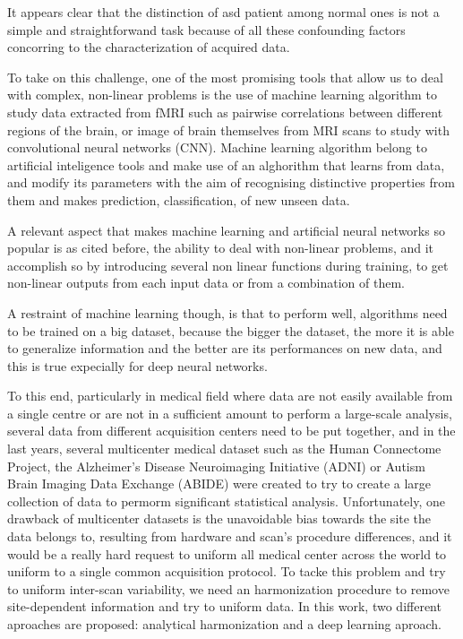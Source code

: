 \documentclass[11pt]{report}
\begin{document}
It appears clear that the distinction of asd patient among normal ones is not a simple and straightforwand task because of all these confounding factors concorring to the characterization of acquired data.

To take on this challenge, one of the most promising tools that allow us to deal with complex, non-linear problems is the use of machine learning algorithm to study data extracted from fMRI such as pairwise correlations between different regions of the brain, or image of brain themselves from MRI scans to study with convolutional neural networks (CNN).
Machine learning algorithm belong to artificial inteligence tools and make use of an alghorithm that learns from data, and modify its parameters with the aim of recognising distinctive properties from them and makes prediction, classification, of new unseen data.

A relevant aspect that makes machine learning and artificial neural networks so popular is as cited before, the ability to deal with non-linear problems, and it accomplish so by introducing several non linear functions during training, to get non-linear outputs from each input data or from a combination of them.

A restraint of machine learning though, is that to perform well, algorithms need to be trained on a big dataset, because the bigger the dataset, the more it is able to generalize information and the better are its performances on new data, and this is true expecially for deep neural networks.

To this end, particularly in medical field where data are not easily available from a single centre or are not in a sufficient amount to perform a large-scale analysis, several data from different acquisition centers need to be put together, and in the last years, several multicenter medical dataset such as the Human Connectome Project, the Alzheimer’s Disease Neuroimaging Initiative (ADNI) or Autism Brain Imaging Data Exchange (ABIDE) were created to try to create a large collection of data to permorm significant statistical analysis.
Unfortunately, one drawback of multicenter datasets is the unavoidable bias towards the site the data belongs to, resulting from hardware and scan's procedure differences, and it would be a really hard request to uniform all medical center across the world to uniform to a single common acquisition protocol.
To tacke this problem and try to uniform inter-scan variability, we need an harmonization procedure to remove site-dependent information and try to uniform data.
In this work, two different aproaches are proposed: analytical harmonization and a deep learning aproach.
\end{document}

